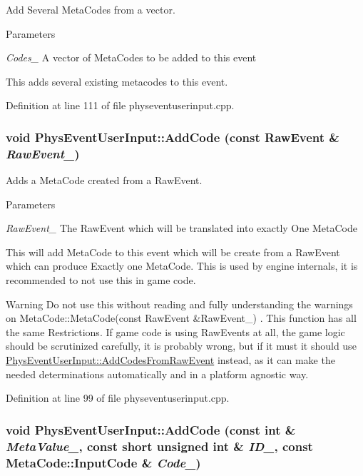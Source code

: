 Add Several MetaCodes from a vector. 
\begin{DoxyParams}{Parameters}
\item[{\em Codes\_\-}]A vector of MetaCodes to be added to this event\end{DoxyParams}
This adds several existing metacodes to this event. 

Definition at line 111 of file physeventuserinput.cpp.\hypertarget{classPhysEventUserInput_a385a4f7a6e88be43b6ba1ffc2a1bb5e3}{
\subsubsection[{AddCode}]{\setlength{\rightskip}{0pt plus 5cm}void PhysEventUserInput::AddCode (const RawEvent \& {\em RawEvent\_\-})}}
\label{dc/d0e/classPhysEventUserInput_a385a4f7a6e88be43b6ba1ffc2a1bb5e3}


Adds a MetaCode created from a RawEvent. 
\begin{DoxyParams}{Parameters}
\item[{\em RawEvent\_\-}]The RawEvent which will be translated into exactly One MetaCode\end{DoxyParams}
This will add MetaCode to this event which will be create from a RawEvent which can produce Exactly one MetaCode. This is used by engine internals, it is recommended to not use this in game code. \begin{DoxyWarning}{Warning}
Do not use this without reading and fully understanding the warnings on MetaCode::MetaCode(const RawEvent \&RawEvent\_\-) . This function has all the same Restrictions. If game code is using RawEvents at all, the game logic should be scrutinized carefully, it is probably wrong, but if it must it should use \hyperlink{classPhysEventUserInput_a9e42f42f9a4a42f792e5cf95856669c0}{PhysEventUserInput::AddCodesFromRawEvent} instead, as it can make the needed determinations automatically and in a platform agnostic way. 
\end{DoxyWarning}


Definition at line 99 of file physeventuserinput.cpp.\hypertarget{classPhysEventUserInput_ace3b98a502b8e784b58bc5dc599fc0c4}{
\subsubsection[{AddCode}]{\setlength{\rightskip}{0pt plus 5cm}void PhysEventUserInput::AddCode (const int \& {\em MetaValue\_\-}, \/  const short unsigned int \& {\em ID\_\-}, \/  const {\bf MetaCode::InputCode} \& {\em Code\_\-})}}
\label{dc/d0e/classPhysEventUserInput_ace3b98a502b8e784b58bc5dc599fc0c4}


